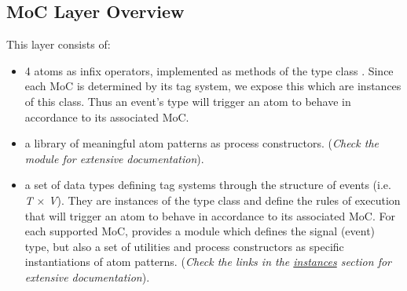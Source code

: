 \subsection{MoC Layer Overview}
This layer consists of:\par
\begin{itemize}
\item
4 atoms as infix operators, implemented as methods of the type
 class . Since each MoC is determined by its tag system, we
 expose this 
 which are instances of this class. Thus an event's type will
 trigger an atom to behave in accordance to its associated MoC.\par

\item
a library of meaningful atom patterns as process constructors.
 (\emph{Check the  module for extensive}
 \emph{documentation}).\par

\item
a set of data types defining tag systems through the structure
 of events (i.e. \emph{T} × \emph{V}). They are instances of the 
 type class and define the rules of execution that will trigger an
 atom to behave in accordance to its associated MoC. For each
 supported MoC,  provides a module which defines the
 signal (event) type, but also a set of utilities and process
 constructors as specific instantiations of atom patterns.
 (\emph{Check the links in the \href{#section.i:MoC}{instances} section for}
 \emph{extensive documentation}).\par

\end{itemize}


